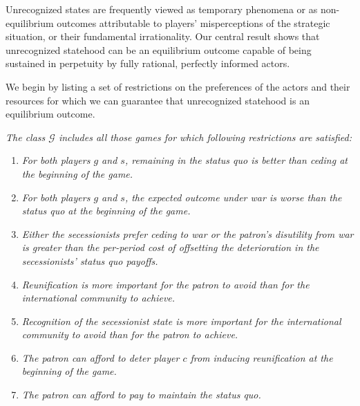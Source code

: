 
Unrecognized states are frequently viewed as temporary phenomena or as non-equilibrium outcomes attributable to players' misperceptions of the strategic situation, or their fundamental irrationality. Our central result shows that unrecognized statehood can be an equilibrium outcome capable of being sustained in perpetuity by fully rational, perfectly informed actors. 

We begin by listing a set of restrictions on the preferences of the actors and their resources for which we can guarantee that unrecognized statehood is an equilibrium outcome.

\begin{definition}
\emph{The class $\mathcal{G}$ includes all those games for which following restrictions are satisfied:}

\begin{enumerate}
\item \textit{For both players $g$ and $s$, remaining in the status quo is better than ceding at the beginning of the game.}\label{res:1}

\item \textit{For both players $g$ and $s$, the expected outcome under war is worse than the status quo at the beginning of the game.}\label{res:2}

\item \textit{Either the secessionists prefer ceding to war or the patron's disutility from war is greater than the per-period cost of offsetting the deterioration in the secessionists' status quo payoffs.}\label{res:new}

\item \textit{Reunification is more important for the patron to avoid than for the international community to achieve.}\label{res:3}

\item  \textit{Recognition of the secessionist state is more important for the international community to avoid than for the patron to achieve.}\label{res:4}

\item  \textit{The patron can afford to deter player $c$ from inducing reunification at the beginning of the game.}\label{res:5}

\item \textit{The patron can afford to pay to maintain the status quo.}\label{res:6}

\end{enumerate}
\end{definition}

